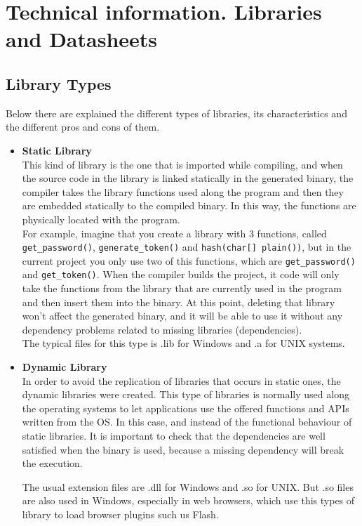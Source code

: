 \chapter{Technical information. Libraries and Datasheets}\label{C:Libraries-Datasheets}
\section{Library Types}\label{S:appendices-libraries-types}
Below there are explained the different types of libraries, its characteristics and the different pros and cons of them.
\begin{itemize}
  \item 
  \textbf{Static Library}
  \\
  This kind of library is the one that is imported while compiling, and when the source code in the library is linked statically in the generated binary, the compiler takes the library functions used along the program and then they are embedded statically to the compiled binary. In this way, the functions are physically located with the program. 
\\
For example, imagine that you create a library with 3 functions, called \verb!get_password()!, \verb!generate_token()! and \verb!hash(char[] plain())!,  but in the current project you only use two of this functions, which are \verb!get_password()! and \verb!get_token()!. When the compiler builds the project, it code will only take the functions from the library that are currently used in the program and then insert them into the binary. At this point, deleting that library won't affect the generated binary, and it will be able to use it without any dependency problems related to missing libraries (dependencies).
\\
The typical files for this type is .lib for Windows and .a for UNIX systems.
  
  \item
  \textbf{Dynamic Library}
  \\
  In order to avoid the replication of libraries that occurs in static ones, the dynamic libraries were created. This type of libraries is normally used along the operating systems to let applications use the offered functions and APIs written from the OS. In this case, and instead of the functional behaviour of static libraries. It is important to check that the dependencies are well satisfied when the binary is used, because a missing dependency will break the execution.

The usual extension files are .dll for Windows and .so for UNIX. But .so files are also used in Windows, especially in web browsers, which use this types of library to load browser plugins such us Flash.


\end{itemize}
